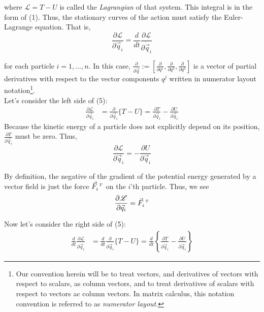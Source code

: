 \documentclass[12pt]{article}
\newcommand{\Lagr}	{\mathscr{L}}		%
\newcommand{\q}		{\vec{q}}
\newcommand{\F}		{\vec{F}}
\newcommand{\T}		{{\hspace{0.1cm} \scriptscriptstyle{T}}}
\begin{document}
where $\Lagr = T-U$ is called the \textit{Lagrangian} of that system. This integral is in the form of (1). Thus, the stationary curves of the action must satisfy the Euler-Lagrange equation. That is,
\begin{equation}
\frac{\partial \Lagr}{\partial \q_i} 
	= \frac{d}{dt} \frac{\partial \Lagr}{\partial \dot{\q}_i}
\end{equation}

for each particle $i = 1, ..., n$. In this case, $\frac{\partial}{\partial \q} := [ 
		\frac{\partial}{\partial q^1}, 
		\frac{\partial}{\partial q^2}, 
		\frac{\partial}{\partial q^3} 
	 ]$ is a vector of partial derivatives with respect to the vector components $q^j$ written in numerator layout notation\footnote{
	Our convention herein will be to treat vectors, and derivatives of 
	vectors with respect to scalars, as column vectors, and to treat
	derivatives of scalars with respect to vectors ac column vectors.
	In matrix calculus, this notation convention is referred to as
	\textit{numerator layout}. 
}.  \\

Let's consider the left side of (5):
\begin{align*}
\frac{\partial \Lagr}{\partial \q_i} 
	&= \frac{\partial}{\partial \q_i} \Big\{ T-U \Big\} 
	= \frac{\partial T}{\partial \q_i} - \frac{\partial U}{\partial \q_i} 
\end{align*}
Because the kinetic energy of a particle does not explicitly depend on its position, $\frac{\partial T}{\partial \q_i}$ must be zero. Thus,
\begin{equation*}
\frac{\partial \Lagr}{\partial \q_i}	= - \frac{\partial U}{\partial \q_i}
\end{equation*}

By definition, the negative of the gradient of the potential energy generated by a vector field is just the force $\F^\T_i$ on the $i$'th particle. Thus, we see
\begin{equation}
\frac{\partial \Lagr}{\partial \q_i} = \F^\T_i
\end{equation} 

Now let's consider the right side of (5):
\begin{align*}
\frac{d}{dt} \frac{\partial \Lagr}{\partial \dot{\q}_i}
	&= \frac{d}{dt} \frac{\partial}{\partial \dot{\q}_i}
		\Big\{ T - U \Big\} 
	= \frac{d}{dt} \left\{ \frac{\partial T}{\partial \dot{\q}_i}
		- \frac{\partial U}{\partial \dot{\q}_i} \right\}			
\end{align*}
\end{document}
